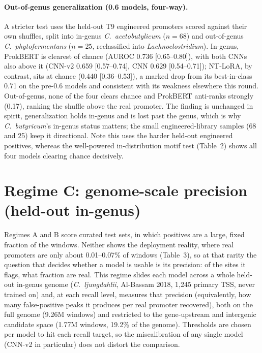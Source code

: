 \documentclass{article}
\begin{document}
\paragraph{Out-of-genus generalization (0.6 models, four-way).} A stricter test uses the held-out T9 engineered promoters scored against their own shuffles, split into in-genus \emph{C.\ acetobutylicum} ($n{=}68$) and out-of-genus \emph{C.\ phytofermentans} ($n{=}25$, reclassified into \emph{Lachnoclostridium}). In-genus, ProkBERT is clearest of chance (AUROC 0.736 [0.65--0.80]), with both CNNs also above it (CNN-v2 0.659 [0.57--0.74], CNN 0.629 [0.54--0.71]); NT-LoRA, by contrast, sits at chance (0.440 [0.36--0.53]), a marked drop from its best-in-class 0.71 on the pre-0.6 models and consistent with its weakness elsewhere this round. Out-of-genus, none of the four clears chance and ProkBERT anti-ranks strongly (0.17), ranking the shuffle above the real promoter. The finding is unchanged in spirit, generalization holds in-genus and is lost past the genus, which is why \emph{C.\ butyricum}'s in-genus status matters; the small engineered-library samples (68 and 25) keep it directional. Note this uses the harder held-out engineered positives, whereas the well-powered in-distribution motif test (Table~2) shows all four models clearing chance decisively.

\section{Regime C: genome-scale precision (held-out in-genus)}
Regimes A and B score curated test sets, in which positives are a large, fixed fraction of the windows. Neither shows the deployment reality, where real promoters are only about 0.01--0.07\% of windows (Table~3), so at that rarity the question that decides whether a model is usable is its precision: of the sites it flags, what fraction are real. This regime slides each model across a whole held-out in-genus genome (\emph{C.\ ljungdahlii}, Al-Bassam 2018, 1{,}245 primary TSS, never trained on) and, at each recall level, measures that precision (equivalently, how many false-positive peaks it produces per real promoter recovered), both on the full genome (9.26M windows) and restricted to the gene-upstream and intergenic candidate space (1.77M windows, 19.2\% of the genome). Thresholds are chosen per model to hit each recall target, so the miscalibration of any single model (CNN-v2 in particular) does not distort the comparison.
\end{document}

